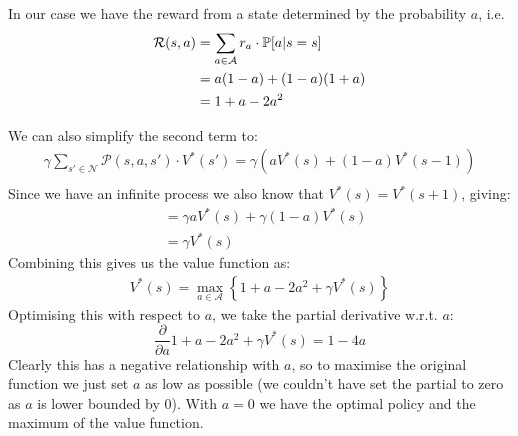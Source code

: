 \documentclass[11pt]{article}
\begin{document}
In our case we have the reward from a state determined by the probability $a$, i.e. 
\begin{align}
    \mathcal{R}(s, a) &= \sum_{a\in\mathcal{A}}r_a\cdot\P{a|s = s} \\
                      &= a(1 - a) + (1-a)(1+a) \\
                      &= 1 + a - 2a^2 \\
\end{align}

We can also simplify the second term to:
\begin{align}
    \gamma\sum_{s'\in\mathcal{N}}\mathcal{P}(s, a, s')\cdot V^*(s') = \gamma(aV^*(s) + (1-a)V^*(s-1)) \\
\end{align}
Since we have an infinite process we also know that $V^*(s) = V^*(s+1)$, giving:
\begin{align}
    &= \gamma aV^*(s) + \gamma(1-a)V^*(s) \\
    &= \gamma V^*(s)
\end{align}
Combining this gives us the value function as:
\begin{align}
    V^*(s) = \max_{a\in\mathcal{A}} \left\{1 + a - 2a^2 + \gamma V^*(s) \right\}
\end{align}
Optimising this with respect to $a$, we take the partial derivative w.r.t. $a$:
$$
\frac{\partial}{\partial a} 1 + a - 2a^2 + \gamma V^*(s) = 1 - 4a
$$
Clearly this has a negative relationship with $a$, so to maximise the original function we just set $a$ as low as possible (we couldn't have set the partial to zero as $a$ is lower bounded by 0). With $a=0$ we have the optimal policy and the maximum of the value function.
\end{document}
